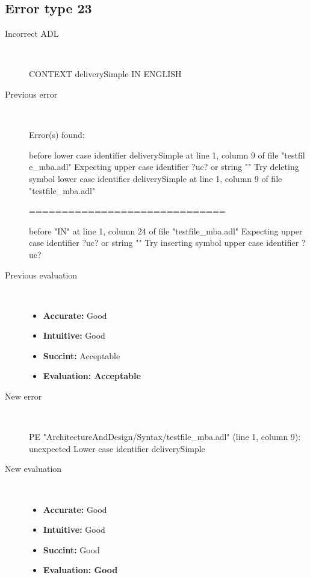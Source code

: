 \hrulefill

\subsection{Error type 23}
  \begin{description}
  \item[Incorrect ADL]~\\
\begin{adl}
CONTEXT deliverySimple IN ENGLISH\end{adl}
  \item[Previous error]~\\
\begin{haskell}
Error(s) found:

before lower case identifier deliverySimple at line 1, column 9 of file "testfil
e_mba.adl"
Expecting upper case identifier ?uc? or string ""
Try deleting symbol lower case identifier deliverySimple at line 1, column 9 of
file "testfile_mba.adl"

==============================

before "IN" at line 1, column 24 of file "testfile_mba.adl"
Expecting upper case identifier ?uc? or string ""
Try inserting symbol upper case identifier ?uc?\end{haskell}
  \item[Previous evaluation]~\\
    \begin{itemize}
    \item \textbf{Accurate:} Good
    \item \textbf{Intuitive:} Good
    \item \textbf{Succint:} Acceptable
    \item \textbf{Evaluation: Acceptable}
    \end{itemize}
  \item[New error]~\\
\begin{haskell}
PE "ArchitectureAndDesign/Syntax/testfile_mba.adl" (line 1, column 9):
unexpected Lower case identifier deliverySimple\end{haskell}
  \item[New evaluation]~\\
    \begin{itemize}
    \item \textbf{Accurate:} Good
    \item \textbf{Intuitive:} Good
    \item \textbf{Succint:} Good
    \item \textbf{Evaluation: Good
}
    \end{itemize}
  \end{description}

